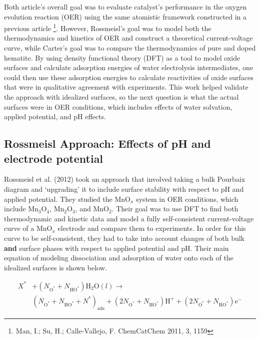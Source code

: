 \documentclass[11pt]{article}
\begin{document}
  Both article's overall goal was to evaluate catalyst's performance in
  the oxygen evolution reaction (OER) using the same atomistic framework
  constructed in a previous article \footnote{Man, I.; Su, H.; Calle-Vallejo, F. ChemCatChem 2011, 3, 1159
 }.
  However, Rossmeisl's goal was to model both the thermodynamics and
  kinetics of OER and construct a theoretical current-voltage curve,
  while Carter's goal was to compare the thermodynamics of pure and
  doped hematite. 
  By using density functional theory (DFT) as a tool to model oxide
  surfaces and calculate adsorption energies of water electrolysis
  intermediates, one could then use these adsorption energies to
  calculate reactivities of oxide surfaces that were in qualitative
  agreement with experiments.
  This work helped validate the approach with idealized surfaces, so the
  next question is what the actual surfaces were in OER conditions,
  which includes effects of water solvation, applied potential, and pH
  effects.
  
\subsection{Rossmeisl Approach: Effects of pH and electrode potential}
\label{sec-2-1}

   Rossmeisl et al. (2012) took an approach that involved taking a bulk
   Pourbaix diagram and `upgrading' it to include surface stability with
   respect to pH and applied potential.
   They studied the MnO$_{x}$ system in OER conditions, which include
   Mn$_{3}$O$_{4}$, Mn$_{2}$O$_{3}$, and MnO$_{2}$.
   Their goal was to use DFT to find both thermodynamic and kinetic data
   and model a fully self-consistent current-voltage curve of a MnO$_{x}$
   electrode and compare them to experiments.
   In order for this curve to be self-consistent, they had to take into
   account changes of both bulk \textbf{and} surface phases with respect to
   applied potential and pH.
   Their main equation of modeling dissociation and adsorption of water
   onto each of the idealized surfaces is shown below.
   
   \begin{equation}
   \begin{split}
   X^\ast &+ (N_{\mathrm{O^\ast}} + N_{\mathrm{HO^\ast}})\mathrm{H_2O}(l)
   \rightarrow \\
   & (N_{\mathrm{O^\ast}} + N_{\mathrm{HO^\ast}} +
   N^\ast)_{\mathrm{ads}} + (2N_{\mathrm{O^\ast}} +
   N_{\mathrm{HO^\ast}})\mathrm{H^+} + (2N_{\mathrm{O^\ast}} + N_{\mathrm{HO^\ast}})\mathrm{e^-}
   \end{split}
   \end{equation}
   
\end{document}
